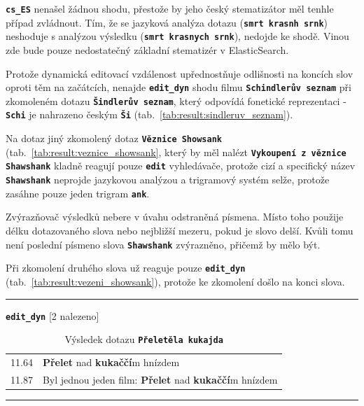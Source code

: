 \documentclass[11pt,letterpaper,oneside,openright]{book}
\newcommand{\bftt}[1]{\texttt{\textbf{#1}}}
\newcommand{\boldred}[1]{\textbf{\color{red} #1}}
\newcommand{\horizlina}%
{
    \mbox{}\vspace{1em}
    \hrule
    \mbox{}
}
\begin{document}
\bftt{cs\_ES} nenašel žádnou shodu, přestože by jeho český stematizátor měl
tenhle případ zvládnout. Tím, že se jazyková analýza dotazu
(\bftt{smrt~krasnh~srnk}) neshoduje s analýzou výsledku
(\bftt{smrt~krasnych~srnk}), nedojde ke shodě. Vinou zde bude pouze
nedostatečný základní stematizér v ElasticSearch.

\mbox{}\mbox{}

Protože dynamická editovací vzdálenost upřednostňuje odlišnosti na
koncích slov oproti těm na začátcích, nenajde \bftt{edit\_dyn} shodu
filmu \bftt{Schindlerův seznam} při zkomoleném dotazu \bftt{Šindlerův
seznam}, který odpovídá fonetické reprezentaci - \bftt{Schi} je
nahrazeno českým \bftt{Ši} (tab.~\ref{tab:result:sindleruv_seznam}).

\mbox{}\mbox{}

Na dotaz jiný zkomolený dotaz \bftt{Věznice Showsank}
(tab.~\ref{tab:result:veznice_showsank}, který by měl nalézt
\bftt{Vykoupení z věznice Shawshank} kladně reagují pouze \bftt{edit}
vyhledávače, protože cizí a specifický název \bftt{Shawshank} neprojde
jazykovou analýzou a trigramový systém selže, protože zasáhne pouze jeden
trigram \bftt{ank}.

Zvýrazňovač výsledků nebere v úvahu odstraněná písmena. Místo toho použije
délku dotazovaného slova nebo nejbližší mezeru, pokud je slovo delší. Kvůli
tomu není poslední písmeno slova \bftt{Shawshank} zvýrazněno, přičemž by mělo
být.

\mbox{}\mbox{}

Při zkomolení druhého slova už reaguje pouze \bftt{edit\_dyn}
(tab.~\ref{tab:result:vezeni_showsank}), protože ke zkomolení došlo na
konci slova.

\mbox{}\mbox{}

\begin{table}[H]
\begin{tt}
\horizlina

\bftt{edit\_dyn} [2 nalezeno]\vspace{5pt}

\begin{tabulary}{1.1\textwidth}{LL}
11.64 & \boldred{Přelet} nad \boldred{kukaččí}m hnízdem \\
11.87 & Byl jednou jeden film: \boldred{Přelet} nad \boldred{kukaččí}m hnízdem \\
\end{tabulary}
\horizlina

\end{tt}
\caption{Výsledek dotazu \bftt{Přeletěla kukajda}}
\label{tab:result:preletela_kukajda}
\end{table}
\end{document}
